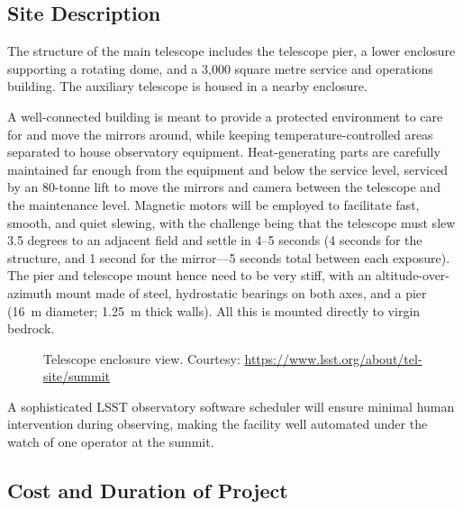\documentclass[12pt,a4paper]{article}
\begin{document}
\subsection{Site Description}

The structure of the main telescope includes the telescope pier, a lower
enclosure supporting a rotating dome, and a 3{,}000 square metre service and
operations building. The auxiliary telescope is housed in a nearby enclosure.

A well-connected building is meant to provide a protected environment to care
for and move the mirrors around, while keeping temperature-controlled areas
separated to house observatory equipment. Heat-generating parts are carefully
maintained far enough from the equipment and below the service level, serviced
by an 80-tonne lift to move the mirrors and camera between the telescope and
the maintenance level. Magnetic motors will be employed to facilitate fast,
smooth, and quiet slewing, with the challenge being that the telescope must
slew 3.5 degrees to an adjacent field and settle in 4--5 seconds (4 seconds
for the structure, and 1 second for the mirror---5 seconds total between each
exposure). The pier and telescope mount hence need to be very stiff, with an
altitude-over-azimuth mount made of steel, hydrostatic bearings on both axes,
and a pier (16~m diameter; 1.25~m thick walls). All this is mounted directly
to virgin bedrock.

\begin{figure}[htbp]
  \centering
  \caption{Telescope enclosure view.
           Courtesy: \url{https://www.lsst.org/about/tel-site/summit}}
  \label{fig:enclosure}
\end{figure}

A sophisticated LSST observatory software scheduler will ensure minimal human
intervention during observing, making the facility well automated under the
watch of one operator at the summit.

\subsection{Cost and Duration of Project}
\end{document}
